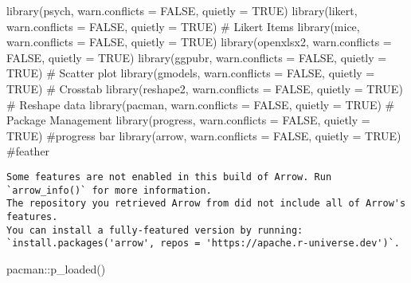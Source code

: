\documentclass[
  letterpaper,
  DIV=11,
  numbers=noendperiod]{scrartcl}
\newenvironment{Shaded}{\begin{snugshade}}{\end{snugshade}}
\newcommand{\AttributeTok}[1]{\textcolor[rgb]{0.40,0.45,0.13}{#1}}
\newcommand{\CommentTok}[1]{\textcolor[rgb]{0.37,0.37,0.37}{#1}}
\newcommand{\ConstantTok}[1]{\textcolor[rgb]{0.56,0.35,0.01}{#1}}
\newcommand{\FunctionTok}[1]{\textcolor[rgb]{0.28,0.35,0.67}{#1}}
\newcommand{\NormalTok}[1]{\textcolor[rgb]{0.00,0.23,0.31}{#1}}
\newcommand{\SpecialCharTok}[1]{\textcolor[rgb]{0.37,0.37,0.37}{#1}}
\begin{document}
\begin{Shaded}
\begin{Highlighting}[]
\FunctionTok{library}\NormalTok{(psych, }\AttributeTok{warn.conflicts =} \ConstantTok{FALSE}\NormalTok{, }\AttributeTok{quietly =} \ConstantTok{TRUE}\NormalTok{)}
\FunctionTok{library}\NormalTok{(likert,  }\AttributeTok{warn.conflicts =} \ConstantTok{FALSE}\NormalTok{, }\AttributeTok{quietly =} \ConstantTok{TRUE}\NormalTok{) }\CommentTok{\# Likert Items}
\FunctionTok{library}\NormalTok{(mice,  }\AttributeTok{warn.conflicts =} \ConstantTok{FALSE}\NormalTok{, }\AttributeTok{quietly =} \ConstantTok{TRUE}\NormalTok{)}
\FunctionTok{library}\NormalTok{(openxlsx2, }\AttributeTok{warn.conflicts =} \ConstantTok{FALSE}\NormalTok{, }\AttributeTok{quietly =} \ConstantTok{TRUE}\NormalTok{)}
\FunctionTok{library}\NormalTok{(ggpubr, }\AttributeTok{warn.conflicts =} \ConstantTok{FALSE}\NormalTok{, }\AttributeTok{quietly =} \ConstantTok{TRUE}\NormalTok{) }\CommentTok{\# Scatter plot}
\FunctionTok{library}\NormalTok{(gmodels,  }\AttributeTok{warn.conflicts =} \ConstantTok{FALSE}\NormalTok{, }\AttributeTok{quietly =} \ConstantTok{TRUE}\NormalTok{) }\CommentTok{\# Crosstab}
\FunctionTok{library}\NormalTok{(reshape2, }\AttributeTok{warn.conflicts =} \ConstantTok{FALSE}\NormalTok{, }\AttributeTok{quietly =} \ConstantTok{TRUE}\NormalTok{) }\CommentTok{\# Reshape data}
\FunctionTok{library}\NormalTok{(pacman,  }\AttributeTok{warn.conflicts =} \ConstantTok{FALSE}\NormalTok{, }\AttributeTok{quietly =} \ConstantTok{TRUE}\NormalTok{) }\CommentTok{\# Package Management}
\FunctionTok{library}\NormalTok{(progress, }\AttributeTok{warn.conflicts =} \ConstantTok{FALSE}\NormalTok{, }\AttributeTok{quietly =} \ConstantTok{TRUE}\NormalTok{) }\CommentTok{\#progress bar}
\FunctionTok{library}\NormalTok{(arrow, }\AttributeTok{warn.conflicts =} \ConstantTok{FALSE}\NormalTok{, }\AttributeTok{quietly =} \ConstantTok{TRUE}\NormalTok{) }\CommentTok{\#feather}
\end{Highlighting}
\end{Shaded}

\begin{verbatim}
Some features are not enabled in this build of Arrow. Run `arrow_info()` for more information.
The repository you retrieved Arrow from did not include all of Arrow's features.
You can install a fully-featured version by running:
`install.packages('arrow', repos = 'https://apache.r-universe.dev')`.
\end{verbatim}

\begin{Shaded}
\begin{Highlighting}[]
\NormalTok{pacman}\SpecialCharTok{::}\FunctionTok{p\_loaded}\NormalTok{()}
\end{Highlighting}
\end{Shaded}
\end{document}
